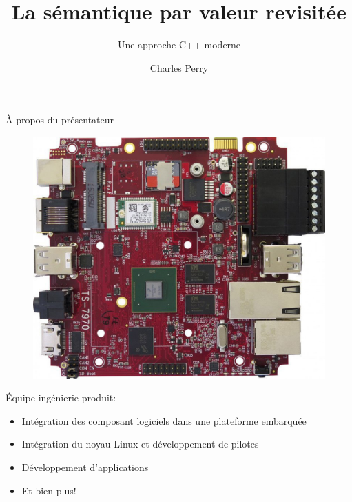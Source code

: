 \documentclass[french]{beamer}
\author{Charles Perry}
\title{La sémantique par valeur revisitée}
\subtitle{Une approche C++ moderne}
\institute {Savoir-Faire Linux}
\begin{document}
\begin{frame}
    \titlepage

\end{frame}

\begin{frame}{À propos du présentateur}
    \begin{minipage}{0.4\linewidth}
    \begin{figure}
        \includegraphics[width=\linewidth]{intro_pcb.jpg}
    \end{figure}
    \end{minipage}
    \begin{minipage}{0.58\linewidth}
        Équipe ingénierie produit:
        \begin{itemize}
            \item Intégration des composant logiciels dans une plateforme embarquée
            \item Intégration du noyau Linux et développement de pilotes
            \item Développement d'applications
            \item Et bien plus!
        \end{itemize}
    \end{minipage}
\end{frame}
\end{document}
